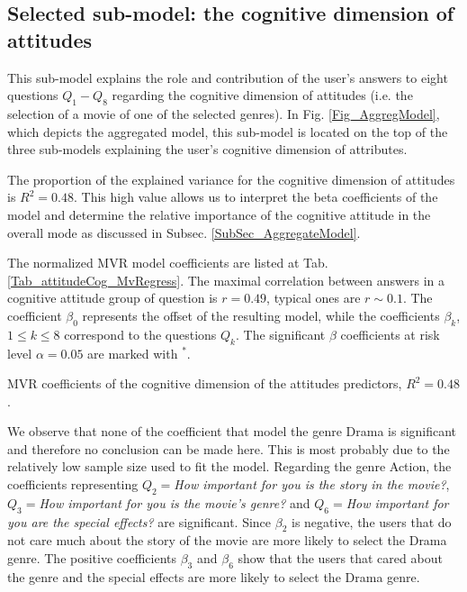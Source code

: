 \documentclass{llncs}
\def\a{{\alpha}}
\def\b{{\beta}}
\begin{document}
\subsection{Selected sub-model: the cognitive dimension of attitudes}\label{SubSec_CogAttr}

This sub-model explains the role and contribution of the user's answers to eight questions $Q_1 - Q_8$ regarding the cognitive dimension of attitudes (i.e. the selection of a movie of one of the selected genres). In Fig. \ref{Fig_AggregModel}, which depicts the aggregated model, this sub-model is located on the top of the three sub-models explaining the user's cognitive dimension of attributes.

The proportion of the explained variance for the cognitive dimension of attitudes is $R^2=0.48$. This high value allows us to interpret the beta coefficients of the model and determine the relative importance of the cognitive attitude in the overall mode as discussed in Subsec. \ref{SubSec_AggregateModel}.

The normalized MVR model coefficients are listed at Tab. \ref{Tab_attitudeCog_MvRegress}. The maximal correlation between answers in a cognitive attitude group of question is $r=0.49$, typical ones are $r\sim 0.1$. The coefficient $\b_0$ 
represents the offset of the resulting model, while the coefficients $\b_k$, $1\leq k \leq 8$ correspond to the questions $Q_k$. The significant $\b$ coefficients at risk level $\a=0.05$ are marked with $^*$. 
\vspace*{-0.5em}
\begin{table}[!h]
  \centering
   
  \caption{MVR coefficients of the cognitive dimension of the attitudes predictors, $R^2 = 0.48$.}
  \label{Tab_attitudeCog_MvRegress}
\end{table}
\vspace*{-1em}
We observe that none of the coefficient that model the genre Drama is significant and therefore no conclusion can be made here. This is most probably due to the relatively low sample size used to fit the model. Regarding the genre Action, the coefficients representing $Q_2=${\it How important for you is the story in the movie?}, $Q_3=${\it How important for you is the movie's genre?} and $Q_6=${\it How important for you are the special effects?} are significant. Since $\b_2$ is negative, the users that do not care much about the story of the movie are more likely to select the Drama genre. The positive coefficients $\b_3$ and $\b_6$ show that the users that cared about the genre and the special effects are more likely to select the Drama genre. 
\end{document}

